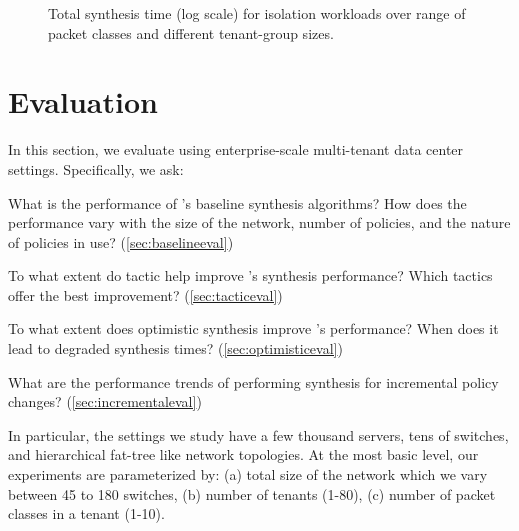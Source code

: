 \begin{figure*}
	\centering
	\caption{\label{fig:isolation}
		Total synthesis time (log scale) for isolation workloads over range of packet classes and different tenant-group sizes.}
\end{figure*}

\section{Evaluation}
In this section, we evaluate \Name using 
enterprise-scale multi-tenant data
center settings. 
Specifically, we ask:

\begin{compactitemize}

\item What is the performance of \Name's baseline synthesis
  algorithms? How does the performance vary with the size of the
  network, number of policies, and the nature of policies in use? (\cref{sec:baselineeval})

\item To what extent do tactic help improve \Name's synthesis
  performance? Which tactics offer the best improvement? (\cref{sec:tacticeval})

\item To what extent does optimistic synthesis improve \Name's
  performance? When does it lead to degraded synthesis times? (\cref{sec:optimisticeval})

\item What are the performance trends of performing
synthesis for incremental policy changes? (\cref{sec:incrementaleval})

\end{compactitemize}
 In
particular, the settings we study have a few thousand servers, tens of
switches, and hierarchical fat-tree like network topologies. At the
most basic level, our experiments are parameterized by: (a) total size
of the network which we vary between 45 to 180 switches, (b) number of
tenants (1-80), (c) number of packet classes in a tenant (1-10). 

